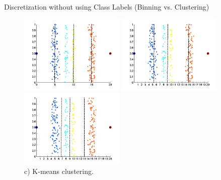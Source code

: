 \begin{frame}{Discretization without using Class Labels (Binning vs. 
Clustering)}
	\begin{figure}[H]
		\centering
		\begin{minipage}{0.32\textwidth}
			\includegraphics[width=5cm]{img/binningvsclustering2.png}
			\caption{a) Equal interval width (binning).}
		\end{minipage}
		\begin{minipage}{0.32\textwidth}
			\centering
			\includegraphics[width=5cm]{img/binningvsclustering3.png}
			\caption{b) Equal frequency (binning).}
		\end{minipage}
		\begin{minipage}{0.32\textwidth}
			\centering
			\includegraphics[width=5cm]{img/binningvsclustering4.png}
			\caption{c) K-means clustering.}
		\end{minipage}\hfill
	\end{figure}
\end{frame}

